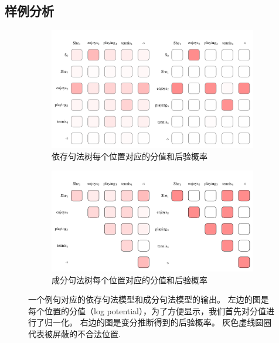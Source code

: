 

\subsection{样例分析}

\begin{figure}[tb!]
	\centering
	\begin{subfigure}[b]{0.9\textwidth}
		\centering
		\includegraphics[scale=0.75]{figures/dep-probs.pdf}
		\caption{依存句法树每个位置对应的分值和后验概率}
		\label{fig:dep-probs}
	\end{subfigure}
	\begin{subfigure}[b]{0.9\textwidth}
		\centering
		\includegraphics[scale=0.75]{figures/con-probs.pdf}
		\caption{成分句法树每个位置对应的分值和后验概率}
		\label{fig:con-probs}
	\end{subfigure}
	\caption{一个例句对应的依存句法模型和成分句法模型的输出。
		左边的图是每个位置的分值（log potential），为了方便显示，我们首先对分值进行了归一化。
		右边的图是变分推断得到的后验概率。
	灰色虚线圆圈代表被屏蔽的不合法位置.}
	
	\label{fig:vi-probs}
\end{figure}

